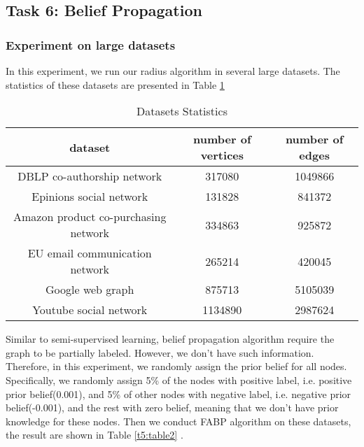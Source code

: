 \subsection{Task 6: Belief Propagation}

\subsubsection{Experiment on large datasets}
In this experiment, we run our radius algorithm in several large datasets. The statistics of these datasets are presented in Table \ref{t5:table1}

\begin{table}[!htbf]
\caption{Datasets Statistics}
\begin{center}
\begin{tabular}{|c|c|c|}
\hline \hline
dataset & number of vertices & number of edges \\
\hline
DBLP co-authorship network & 317080  & 1049866  \\
Epinions social network & 131828  & 841372  \\
Amazon product co-purchasing network & 334863 & 925872 \\
EU email communication network & 265214 & 420045 \\
Google web graph & 875713 & 5105039 \\
Youtube social network & 1134890 & 2987624 \\
\hline
\end{tabular}
\end{center}
\label{t5:table1}
\end{table}%

Similar to semi-supervised learning, belief propagation algorithm require the graph to be partially labeled.  However, we don't have such information. Therefore, in this experiment, we randomly assign the prior belief for all nodes. Specifically, we randomly assign 5\% of the nodes with positive label, i.e. positive prior belief(0.001), and  5\% of other nodes with negative label, i.e. negative prior belief(-0.001), and the rest with zero belief, meaning that we don't have prior knowledge for these nodes. Then we conduct FABP algorithm on these datasets, the result are shown in Table \ref{t5:table2} .

